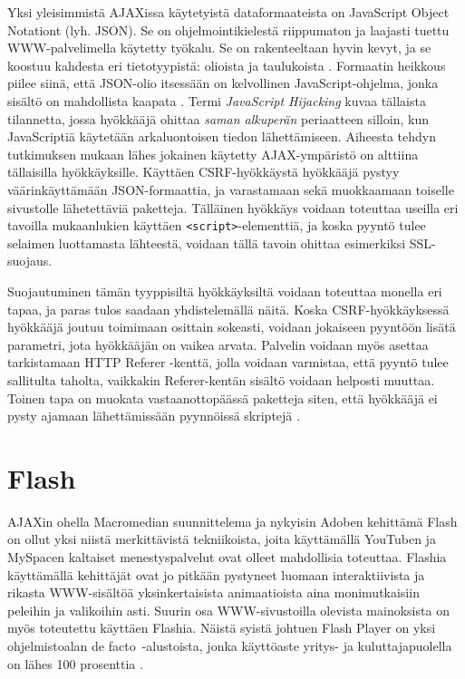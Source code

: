 Yksi yleisimmistä AJAXissa käytetyistä dataformaateista on JavaScript Object Notationt (lyh. JSON). Se on ohjelmointikielestä riippumaton ja laajasti tuettu WWW-palvelimella käytetty 
työkalu. Se on rakenteeltaan hyvin kevyt, ja se koostuu kahdesta eri tietotyypistä: olioista ja taulukoista \cite{JSON}. Formaatin heikkous piilee siinä, että JSON-olio itsessään on kelvollinen 
JavaScript-ohjelma, jonka sisältö on mahdollista kaapata \cite{AJAX}. Termi \emph{JavaScript Hijacking} kuvaa tällaista tilannetta, jossa hyökkääjä ohittaa \emph{saman alkuperän} periaatteen silloin,
kun JavaScriptiä käytetään arkaluontoisen tiedon lähettämiseen. Aiheesta tehdyn tutkimuksen \cite{JSH} mukaan lähes jokainen käytetty AJAX-ympäristö on alttiina tällaisilla hyökkäyksille. Käyttäen 
CSRF-hyökkäystä hyökkääjä pystyy väärinkäyttämään JSON-formaattia, ja varastamaan sekä muokkaamaan toiselle sivustolle lähetettäviä paketteja.  Tälläinen hyökkäys voidaan toteuttaa useilla eri 
tavoilla mukaanlukien käyttäen \texttt{<script>}-elementtiä, ja koska pyyntö tulee selaimen luottamasta lähteestä, voidaan tällä tavoin ohittaa esimerkiksi SSL-suojaus\cite{AJAX}.

Suojautuminen tämän tyyppisiltä hyökkäyksiltä voidaan toteuttaa monella eri tapaa, ja paras tulos saadaan yhdistelemällä näitä. Koska CSRF-hyökkäyksessä hyökkääjä joutuu toimimaan osittain sokeasti, 
voidaan jokaiseen pyyntöön lisätä parametri, jota hyökkääjän on vaikea arvata. Palvelin voidaan myös asettaa tarkistamaan HTTP Referer -kenttä, jolla voidaan varmistaa, että pyyntö tulee sallitulta 
taholta, vaikkakin Referer-kentän sisältö voidaan helposti muuttaa. Toinen tapa on muokata vastaanottopäässä paketteja siten, että hyökkääjä ei pysty ajamaan lähettämissään pyynnöissä skriptejä 
\cite{JSH}.

\section{Flash}

AJAXin ohella Macromedian suunnittelema ja nykyisin Adoben kehittämä Flash on ollut yksi niistä merkittävistä tekniikoista, joita käyttämällä YouTuben ja MySpacen kaltaiset 
menestyspalvelut ovat olleet mahdollisia toteuttaa. Flashia käyttämällä kehittäjät ovat jo pitkään pystyneet luomaan interaktiivista ja rikasta WWW-sisältöä
yksinkertaisista animaatioista aina monimutkaisiin peleihin ja valikoihin asti. Suurin osa WWW-sivustoilla olevista mainoksista on myös toteutettu käyttäen Flashia. Näistä syistä johtuen 
Flash Player on yksi ohjelmistoalan de facto~-alustoista, jonka käyttöaste yritys- ja kuluttajapuolella on lähes 100 prosenttia \cite{Flash}.

